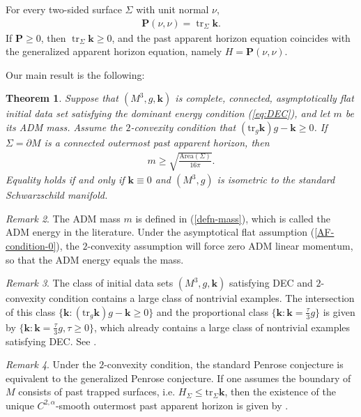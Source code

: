 \documentclass[11pt,letterpaper]{amsart}
\newtheorem{thm}{Theorem}[section]
\theoremstyle{definition}
\theoremstyle{remark}
\newtheorem{rmk}[thm]{Remark}
\newcommand{\tr}{\operatorname{tr}}
\newcommand{\Pten}{\mathbf P}
\newcommand{\kten}{\mathbf k}
\begin{document}
For every two-sided surface \(\Sigma\) with unit normal $\nu $,
\begin{align}\label{eq:P-basic}
  \Pten (\nu,\nu)=\tr_\Sigma\kten.
\end{align}
If $\Pten \geq 0$, then
\(\tr_\Sigma\kten\geq 0\), and the past apparent horizon equation coincides with the generalized apparent horizon equation, namely \(H=\Pten(\nu,\nu)\).

Our main result is the following:
\begin{thm}\label{thm-main}
	Suppose that $(M^3, g, \kten)$ is complete, connected, asymptotically flat initial data set satisfying the dominant energy condition (\ref{eq:DEC}), and let $m$ be its ADM mass. Assume the $2$-convexity condition that $(\mathrm{tr}_{g} \kten) g - \kten \geq 0$. If $\Sigma = \partial M $ is a connected outermost past apparent horizon, then
	\begin{align*}
		m \geq \sqrt{\frac{\mathrm{Area}(\Sigma )}{16 \pi }} .
	\end{align*} 
	Equality holds if and only if $\kten \equiv 0$ and $(M^3, g)$ is isometric to the standard Schwarzschild manifold.
\end{thm}

\begin{rmk}
	The ADM mass $m$ is defined in (\ref{defn-mass}),  which is called the ADM energy in the literature. Under the asymptotical flat assumption (\ref{AF-condition-0}), the $2$-convexity assumption will force zero ADM linear momentum, so that the ADM energy equals the mass.
\end{rmk}

\begin{rmk}
	The class of initial data sets $(M^3, g, \kten)$ satisfying DEC and $2$-convexity condition contains a large class of nontrivial examples. The intersection of this class $\{\kten: (\mathrm{tr}_{g} \kten) g - \kten \geq 0\} $ and the proportional class $\{ \kten: \kten = \frac{\tau }{3} g\} $ is given by $\{\kten: \kten = \frac{\tau }{3} g, \tau  \geq 0\} $, which already contains a large class of nontrivial examples satisfying DEC.
 See \cite[Examples 2.1]{Dong26SigmaIMCF}.
\end{rmk}
\begin{rmk}
	Under the $2$-convexity condition, the standard Penrose conjecture is equivalent to the generalized Penrose conjecture. If one assumes the boundary of $M$ consists of past trapped surfaces, i.e. $H_{\Sigma } \leq \mathrm{tr}_{\Sigma } \kten$, then the existence of the unique $C^{2,\alpha }$-smooth outermost past apparent horizon is given by \cite{Eichmair10}.
\end{rmk}
\end{document}
